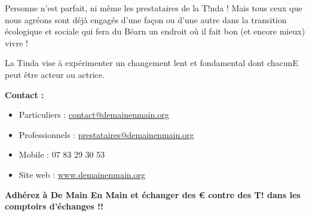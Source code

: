     \vspace{.2cm}

\noindent Personne n’est parfait, ni même les prestataires de la T!nda ! Mais tous ceux que nous agréons sont déjà engagés
d’une façon ou d’une autre dans la transition écologique et sociale qui fera du Béarn un endroit où il fait bon (et
encore mieux) vivre !
    \vspace{.2cm}

\noindent La Tinda vise à expérimenter un changement lent et fondamental dont chacunE peut être acteur ou actrice.

    \vspace{.5cm}


      \textbf{Contact :}
    \begin{itemize}
      \item[] Particuliers : \href{mailto:contact@demainenmain.org}{contact@demainenmain.org}
      \item[] Professionnels : \href{mailto:prestataires@demainenmain.org}{prestataires@demainenmain.org}
      \item[] Mobile : 07 83 29 30 53 
      \item[] Site web : \href{https://www.demainenmain.org}{www.demainenmain.org}
    \end{itemize}

    \vspace{1cm}

  \begin{center}
    {\Large \textbf{Adhérez à De Main En Main et échanger des € contre des T! dans les comptoirs d’échanges !!}}
  \end{center}
